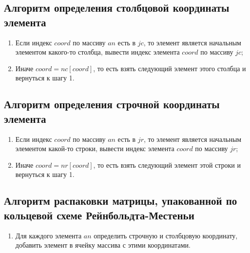 \documentclass[12pt, a4paper]{article}
\begin{document}
\subsection{Алгоритм определения столбцовой координаты 
элемента}
\begin{enumerate}
	\item Если индекс $coord$ по массиву $an$ есть в 
	$jc$, то элемент является начальным элементом 
	какого-то столбца, вывести индекс элемента $coord$ 
	по массиву $jc$;
	\item Иначе $coord=nc[coord]$, то есть взять 
	следующий элемент этого столбца и вернуться к шагу 
	1.
\end{enumerate}
\subsection{Алгоритм определения строчной координаты 
элемента}
\begin{enumerate}
	\item Если индекс $coord$ по массиву $an$ есть в 
	$jr$, то элемент является начальным элементом 
	какой-то строки, вывести индекс элемента $coord$ 
	по массиву $jr$;
	\item Иначе $coord=nr[coord]$, то есть взять 
	следующий элемент этой строки и вернуться к шагу 
	1.
\end{enumerate}
\subsection{Алгоритм распаковки матрицы, упакованной по 
кольцевой схеме Рейнбольдта-Местеньи}
\begin{enumerate}
	\item Для каждого элемента $an$ определить строчную 
	и столбцовую координату, добавить элемент в ячейку
	массива с этими координатами.
\end{enumerate}
\end{document}
